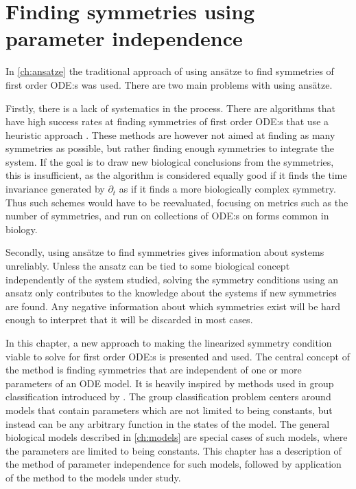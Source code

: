 \chapter{Finding symmetries using parameter independence} \label{ch:param-ind}

In \cref{ch:ansatze} the traditional approach of using ansätze to find symmetries of first order ODE:s was used.
There are two main problems with using ansätze.

Firstly, there is a lack of systematics in the process.
There are algorithms that have high success rates at finding symmetries of first order ODE:s that use a heuristic approach \cite{chebterrab1997computer,chebterrab1998patterns}.
These methods are however not aimed at finding as many symmetries as possible, but rather finding enough symmetries to integrate the system.
If the goal is to draw new biological conclusions from the symmetries, this is insufficient, as the algorithm is considered equally good if it finds the time invariance generated by \(\partial_t\) as if it finds a more biologically complex symmetry.
Thus such schemes would have to be reevaluated, focusing on metrics such as the number of symmetries, and run on collections of ODE:s on forms common in biology.

Secondly, using ansätze to find symmetries gives information about systems unreliably.
Unless the ansatz can be tied to some biological concept independently of the system studied, solving the symmetry conditions using an ansatz only contributes to the knowledge about the systems if new symmetries are found.
Any negative information about which symmetries exist will be hard enough to interpret that it will be discarded in most cases.

In this chapter, a new approach to making the linearized symmetry condition viable to solve for first order ODE:s is presented and used.
The central concept of the method is finding symmetries that are independent of one or more parameters of an ODE model.
It is heavily inspired by methods used in group classification introduced by \citeauthor{ovsiannikov1982group} \cite{ovsiannikov1982group}.
The group classification problem centers around models that contain parameters which are not limited to being constants, but instead can be any arbitrary function in the states of the model.
The general biological models described in \cref{ch:models} are special cases of such models, where the parameters are limited to being constants.
This chapter has a description of the method of parameter independence for such models, followed by application of the method to the models under study.

